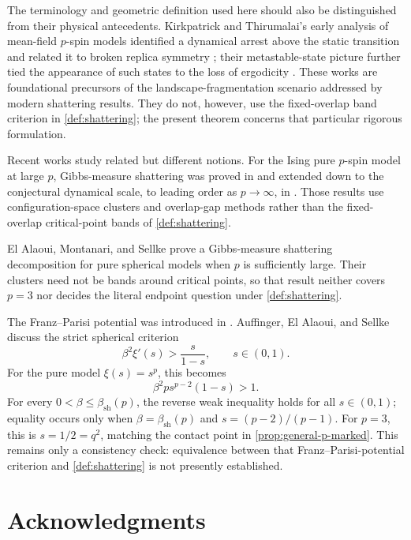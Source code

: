 \documentclass[11pt,reqno]{amsart}
\numberwithin{equation}{section}
\theoremstyle{plain}
\theoremstyle{definition}
\theoremstyle{remark}
\newcommand{\1}{\mathbf 1}
\begin{document}
The terminology and geometric definition used here should also be
distinguished from their physical antecedents.  Kirkpatrick and
Thirumalai's early analysis of mean-field \(p\)-spin models identified a
dynamical arrest above the static transition and related it to broken
replica symmetry \cite{KirkpatrickThirumalai1987Dynamics,KirkpatrickThirumalai1987Connections};
their metastable-state picture further tied the appearance of such
states to the loss of ergodicity \cite{KirkpatrickThirumalai1988Metastable}.
These works are foundational precursors of the landscape-fragmentation
scenario addressed by modern shattering results.  They do not, however,
use the fixed-overlap band criterion in \cref{def:shattering}; the
present theorem concerns that particular rigorous formulation.

Recent works study related but different notions.  For the Ising pure
\(p\)-spin model at large \(p\), Gibbs-measure shattering was proved in
\cite{GamarnikJagannathKizildag2025} and extended down to the
conjectural dynamical scale, to leading order as \(p\to\infty\), in
\cite{ElAlaoui2026}.  Those results use configuration-space clusters
and overlap-gap methods rather than the fixed-overlap critical-point
bands of \cref{def:shattering}.

El Alaoui,
Montanari, and Sellke \cite{ElAlaouiMontanariSellke2025} prove a
Gibbs-measure shattering decomposition for pure spherical models when
\(p\) is sufficiently large.  Their clusters need not be bands around
critical points, so that result neither covers \(p=3\) nor decides the
literal endpoint question under \cref{def:shattering}.

The Franz--Parisi potential was introduced in
\cite{FranzParisi1995}.  Auffinger, El Alaoui, and Sellke
\cite[Section~5]{AuffingerElAlaouiSellke2025} discuss the strict
spherical criterion
\[
 \beta^2\xi'(s)>\frac{s}{1-s},\qquad s\in(0,1).
\]
For the pure model \(\xi(s)=s^p\), this becomes
\[
 \beta^2p s^{p-2}(1-s)>1.
\]
For every \(0<\beta\leq\beta_{\mathrm{sh}}(p)\), the reverse weak
inequality holds for all \(s\in(0,1)\); equality occurs only when
\(\beta=\beta_{\mathrm{sh}}(p)\) and
\(s=(p-2)/(p-1)\).  For \(p=3\), this is \(s=1/2=q^2\), matching the
contact point in \cref{prop:general-p-marked}.  This remains only a
consistency check: equivalence between that Franz--Parisi-potential
criterion and \cref{def:shattering} is not presently established.

\section*{Acknowledgments}
\end{document}
